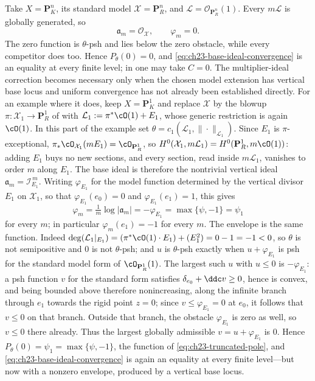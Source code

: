 \begin{example}
\label{ex:ch23-globally-generated}
Take $X=\mathbf P^n_K$, its standard model
$\mathcal X=\mathbf P^n_R$, and
$\mathcal L=\mathcal O_{\mathbf P^n_R}(1)$.  Every
$m\mathcal L$ is globally generated, so
\[
                 \mathfrak a_m=\mathcal O_{\mathcal X},
                 \qquad \varphi_m=0.
\]
The zero function is $\theta$-psh and lies below the zero obstacle, while
every competitor does too.  Hence $P_\theta(0)=0$, and
\eqref{eq:ch23-base-ideal-convergence} is an equality at every finite level;
in  one may take $C=0$.  The
multiplier-ideal correction becomes necessary only when the chosen
model extension has vertical base locus and uniform convergence has not
already been established directly.  For an example where it does, keep
$X=\mathbf P^1_K$ and replace $\mathcal X$ by the blowup
$\pi:\mathcal X_1\to\mathbf P^1_R$ of 
with
$\mathcal L_1:=\pi^*\cO(1)+E_1$, whose generic restriction is again
$\cO(1)$.  In this part of the example set
$\theta=c_1(\mathcal L_1,\|\cdot\|_{\mathcal L_1})$.
Since $E_1$ is $\pi$-exceptional,
$\pi_*\cO_{\mathcal X_1}(mE_1)=\cO_{\mathbf P^1_R}$, so
$H^0(\mathcal X_1,m\mathcal L_1)=H^0(\mathbf P^1_R,m\cO(1))$: adding
$E_1$ buys no new sections, and every section, read inside
$m\mathcal L_1$, vanishes to order $m$ along $E_1$.  The base ideal is
therefore the nontrivial vertical ideal
$\mathfrak a_m=\mathcal I_{E_1}^{\,m}$.  Writing $\varphi_{E_1}$ for the
model function determined by the vertical divisor $E_1$ on
$\mathcal X_1$, so that $\varphi_{E_1}(e_0)=0$ and
$\varphi_{E_1}(e_1)=1$, this gives
\[
 \varphi_m=\tfrac1m\log|\mathfrak a_m|=-\varphi_{E_1}
          =\max\{\psi,-1\}=\psi_1
\]
for every $m$; in particular $\varphi_m(e_1)=-1$ for every $m$.
The envelope is the same function.  Indeed
$\deg(\mathcal L_1|_{E_1})=(\pi^*\cO(1)\cdot E_1)+(E_1^2)=0-1=-1<0$, so
$\theta$ is not semipositive and $0$ is not $\theta$-psh; and $u$ is
$\theta$-psh exactly when $u+\varphi_{E_1}$ is psh for the standard
model form of $\cO_{\mathbf P^1_R}(1)$.  The largest such $u$ with
$u\leq0$ is $-\varphi_{E_1}$: a psh function $v$ for the standard form
satisfies $\delta_{e_0}+\ddc v\geq0$, hence is convex, and being bounded
above therefore nonincreasing, along the infinite branch through $e_1$
towards the rigid point $z=0$; since $v\leq\varphi_{E_1}=0$ at
$e_0$, it follows that $v\leq0$ on that branch.  Outside that branch,
the obstacle $\varphi_{E_1}$ is zero as well, so
$v\leq0$ there already.  Thus the largest globally admissible
$v=u+\varphi_{E_1}$ is $0$.  Hence
$P_\theta(0)=\psi_1=\max\{\psi,-1\}$, the function of
\eqref{eq:ch23-truncated-pole}, and
\eqref{eq:ch23-base-ideal-convergence} is again an equality at every finite
level---but now with a nonzero envelope, produced by a vertical base
locus.
\end{example}

